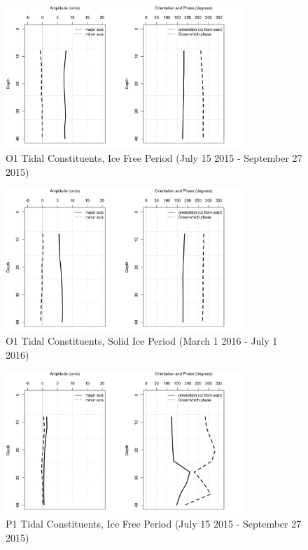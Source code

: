 \documentclass[12pt]{dforeport}
\begin{document}
\begin{figure}  
\centering
\includegraphics[width = 0.8\textwidth]{./figures/59_O1TC_if_2015.png}
\caption[O1 Tidal Constituents, Ice free, 2015]{O1 Tidal Constituents, Ice Free Period (July 15 2015 - September 27 2015)}
\label{f:o1_if_2015}
\end{figure}

\begin{figure}  
\centering
\includegraphics[width = 0.8\textwidth]{./figures/60_O1TC_si_2015.png}
\caption[O1 Tidal Constituents, Solid Ice, 2015]{O1 Tidal Constituents, Solid Ice Period (March 1 2016 - July 1 2016)}
\label{f:o1_si_2015}
\end{figure}


\begin{figure}  
\centering
\includegraphics[width = 0.8\textwidth]{./figures/61_P1TC_if_2015.png}
\caption[P1 Tidal Constituents, Ice free, 2015]{P1 Tidal Constituents, Ice Free Period (July 15 2015 - September 27 2015)}
\label{f:p1_if_2015}
\end{figure}
\end{document}
